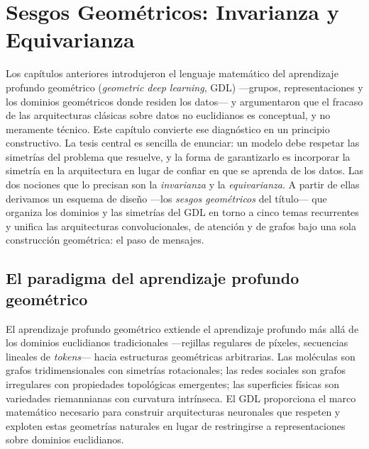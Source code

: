 \providecommand{\Nb}{\mathcal{N}}
\providecommand{\GL}{\operatorname{GL}}
\providecommand{\Aut}{\operatorname{Aut}}
\providecommand{\tr}{\operatorname{tr}}
\providecommand{\HASH}{\operatorname{HASH}}
\providecommand{\deg}{\operatorname{deg}}

\chapter{Sesgos Geom\'etricos: Invarianza y Equivarianza}
\label{ch:priors}

Los cap\'itulos anteriores introdujeron el lenguaje matem\'atico del aprendizaje
profundo geom\'etrico (\emph{geometric deep learning}, GDL) ---grupos,
representaciones y los dominios geom\'etricos donde residen los datos--- y
argumentaron que el fracaso de las arquitecturas cl\'asicas sobre datos no
euclidianos es conceptual, y no meramente t\'ecnico. Este cap\'itulo convierte ese
diagn\'ostico en un principio constructivo. La tesis central es sencilla de
enunciar: un modelo debe respetar las simetr\'ias del problema que resuelve, y la
forma de garantizarlo es incorporar la simetr\'ia en la arquitectura en lugar de
confiar en que se aprenda de los datos. Las dos nociones que lo precisan son la
\emph{invarianza} y la \emph{equivarianza}. A partir de ellas derivamos un
esquema de dise\~no ---los \emph{sesgos geom\'etricos} del t\'itulo--- que organiza
los dominios y las simetr\'ias del GDL en torno a cinco temas recurrentes y
unifica las arquitecturas convolucionales, de atenci\'on y de grafos bajo una
sola construcci\'on geom\'etrica: el paso de mensajes.

\section{El paradigma del aprendizaje profundo geom\'etrico}
\label{sec:priors:paradigm}

El aprendizaje profundo geom\'etrico extiende el aprendizaje profundo m\'as all\'a
de los dominios euclidianos tradicionales ---rejillas regulares de p\'ixeles,
secuencias lineales de \emph{tokens}--- hacia estructuras geom\'etricas
arbitrarias. Las mol\'eculas son grafos tridimensionales con simetr\'ias
rotacionales; las redes sociales son grafos irregulares con propiedades
topol\'ogicas emergentes; las superficies f\'isicas son variedades riemannianas
con curvatura intr\'inseca. El GDL proporciona el marco matem\'atico necesario
para construir arquitecturas neuronales que respeten y exploten estas geometr\'ias
naturales en lugar de restringirse a representaciones sobre dominios euclidianos.

